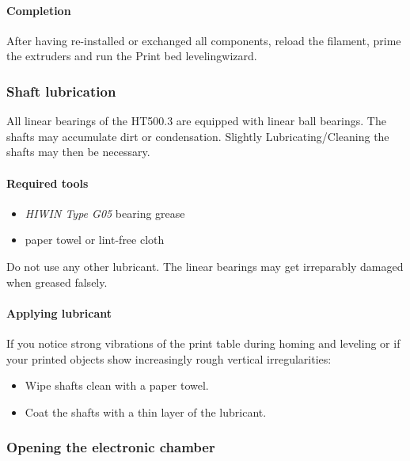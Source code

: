 \paragraph{Completion}

After having re-installed or exchanged all components, 
reload the filament, prime the extruders and run the \lbrack Print bed leveling\rbrack  wizard. 


\subsubsection{Shaft lubrication} \label{sec:lubrication}

All linear bearings of the HT500.3 are equipped with linear ball bearings. The shafts may accumulate dirt or condensation. Slightly Lubricating/Cleaning the shafts may then be necessary.

\paragraph{Required tools}

\begin{itemize}
  \item \emph{HIWIN Type G05} bearing grease
  \item paper towel or lint-free cloth
\end{itemize}

\begin{notice}
  Do not use any other lubricant. The linear bearings may get irreparably damaged when greased falsely. 
\end{notice}

\paragraph{Applying lubricant}

If you notice strong vibrations of the print table during homing and leveling or if your printed objects show increasingly rough vertical irregularities:

\begin{itemize}
  \item Wipe shafts clean with a paper towel.
  \item Coat the shafts with a thin layer of the lubricant.
\end{itemize}

\subsubsection{Opening the electronic chamber}

